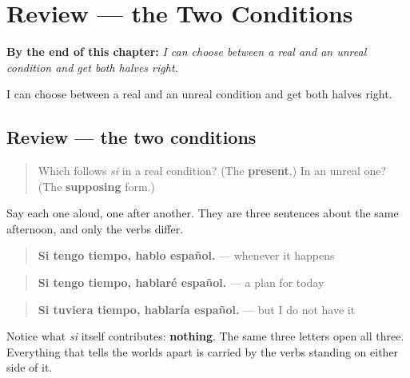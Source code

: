 
\chapter{Review --- the Two Conditions}
\label{ch:repaso-condiciones}

\begin{chapteropening}
\textbf{By the end of this chapter:} \emph{I can choose between a real and an unreal condition and get both halves right.}

I can choose between a real and an unreal condition and get both halves right.
\end{chapteropening}

\section[the two conditions]{Review — the two conditions}

\label{lesson:ES-C56-repaso-condiciones}



\begin{quote}
Which follows \emph{si} in a real condition? (The \textbf{present}.) In an unreal one? (The \textbf{supposing} form.)
\end{quote}

\begin{grammarlens}[title={What you've built}]
Say each one aloud, one after another. They are three sentences about the same afternoon, and only the verbs differ.

\begin{quote}
\textbf{Si tengo tiempo, hablo español.} — whenever it happens
\end{quote}

\begin{quote}
\textbf{Si tengo tiempo, hablaré español.} — a plan for today
\end{quote}

\begin{quote}
\textbf{Si tuviera tiempo, hablaría español.} — but I do not have it
\end{quote}

Notice what \emph{si} itself contributes: \textbf{nothing}. The same three letters open all three. Everything that tells the worlds apart is carried by the verbs standing on either side of it.
\end{grammarlens}

